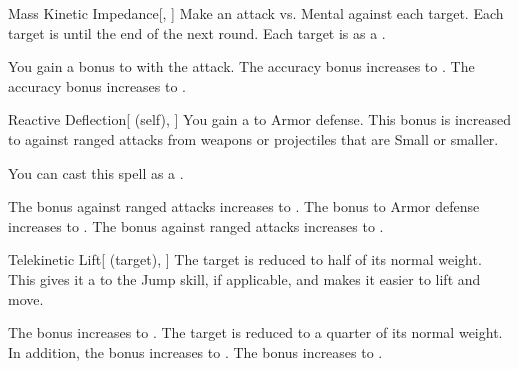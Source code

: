 \lowercase{\hypertarget{spell:Mass Kinetic Impedance}{}}\label{spell:Mass Kinetic Impedance}
\begin{freeability}[Rank 1]{\hypertarget{spell:Mass Kinetic Impedance}{Mass Kinetic Impedance}}[, ]
Make an attack vs. Mental against each target.
\hit Each target is  until the end of the next round.
\crit Each target is  as a .

\rankline
{} You gain a  bonus to  with the attack.
 The accuracy bonus increases to .
 The accuracy bonus increases to .
\end{freeability}
\vspace{0.25em}



\lowercase{\hypertarget{spell:Reactive Deflection}{}}\label{spell:Reactive Deflection}
\begin{attuneability}[Rank 1]{\hypertarget{spell:Reactive Deflection}{Reactive Deflection}}[ (self), ]
You gain a   to Armor defense.
This bonus is increased to  against  ranged attacks from weapons or projectiles that are Small or smaller.

You can cast this spell as a .

\rankline
{} The bonus against ranged attacks increases to .
 The bonus to Armor defense increases to .
 The bonus against ranged attacks increases to .
\end{attuneability}
\vspace{0.25em}



\lowercase{\hypertarget{spell:Telekinetic Lift}{}}\label{spell:Telekinetic Lift}
\begin{attuneability}[Rank 1]{\hypertarget{spell:Telekinetic Lift}{Telekinetic Lift}}[ (target), ]
The target is reduced to half of its normal weight.
This gives it a   to the Jump skill, if applicable, and makes it easier to lift and move.

\rankline
{} The bonus increases to .
 The target is reduced to a quarter of its normal weight. In addition, the bonus increases to .
 The bonus increases to .
\end{attuneability}
\vspace{0.25em}



